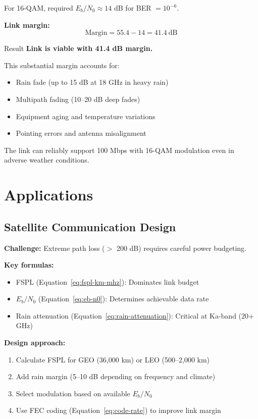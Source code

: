 For 16-QAM, required $E_b/N_0 \approx 14$ dB for BER $= 10^{-6}$.

\textbf{Link margin:}
\begin{equation}
\text{Margin} = 55.4 - 14 = 41.4\ \text{dB}
\end{equation}

\begin{calloutbox}[colback=green!10,colframe=green!50!black]{Result}
\textbf{Link is viable with 41.4 dB margin.}

This substantial margin accounts for:
\begin{itemize}
\item Rain fade (up to 15 dB at 18 GHz in heavy rain)
\item Multipath fading (10--20 dB deep fades)
\item Equipment aging and temperature variations
\item Pointing errors and antenna misalignment
\end{itemize}

The link can reliably support 100 Mbps with 16-QAM modulation even in adverse weather conditions.
\end{calloutbox}

\section{Applications}
\label{sec:applications}

\subsection{Satellite Communication Design}

\textbf{Challenge:} Extreme path loss ($>$ 200 dB) requires careful power budgeting.

\textbf{Key formulas:}
\begin{itemize}
\item FSPL (Equation~\ref{eq:fspl-km-mhz}): Dominates link budget
\item $E_b/N_0$ (Equation~\ref{eq:eb-n0}): Determines achievable data rate
\item Rain attenuation (Equation~\ref{eq:rain-attenuation}): Critical at Ka-band (20+ GHz)
\end{itemize}

\textbf{Design approach:}
\begin{enumerate}
\item Calculate FSPL for GEO (36,000 km) or LEO (500--2,000 km)
\item Add rain margin (5--10 dB depending on frequency and climate)
\item Select modulation based on available $E_b/N_0$
\item Use FEC coding (Equation~\ref{eq:code-rate}) to improve link margin
\end{enumerate}


